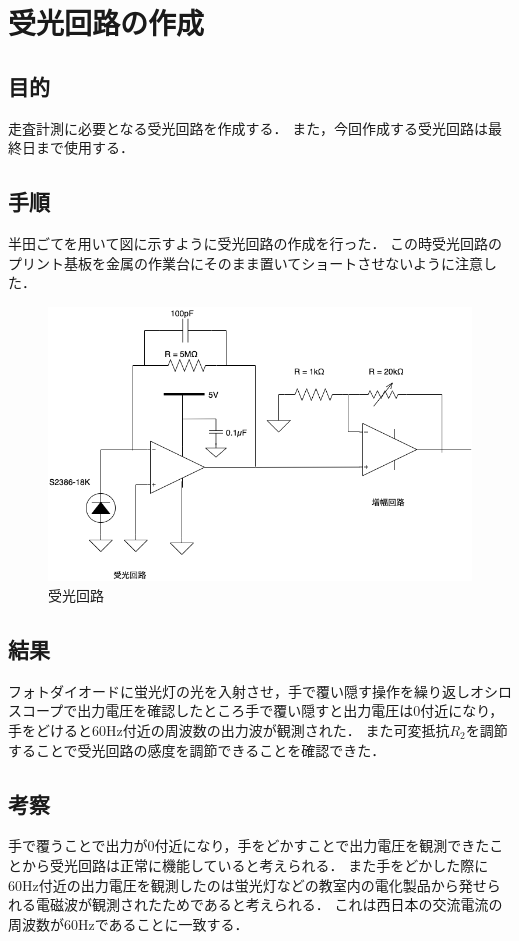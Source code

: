 \documentclass[11pt, a4paper,twocolumn]{jarticle}
\begin{document}
\section{受光回路の作成}
\subsection{目的}
走査計測に必要となる受光回路を作成する．
また，今回作成する受光回路は最終日まで使用する．
\subsection{手順}
半田ごてを用いて図に示すように受光回路の作成を行った．
この時受光回路のプリント基板を金属の作業台にそのまま置いてショートさせないように注意した．

\begin{figure}[ht]
 \begin{center}
  \includegraphics[width=0.8\linewidth]{fig1.png}
 \end{center}
 \caption{受光回路}
 \label{fig:1}
\end{figure}

\subsection{結果}
フォトダイオードに蛍光灯の光を入射させ，手で覆い隠す操作を繰り返しオシロスコープで出力電圧を確認したところ手で覆い隠すと出力電圧は0付近になり，手をどけると60Hz付近の周波数の出力波が観測された．
また可変抵抗${R_2}$を調節することで受光回路の感度を調節できることを確認できた．

\subsection{考察}
手で覆うことで出力が0付近になり，手をどかすことで出力電圧を観測できたことから受光回路は正常に機能していると考えられる．
また手をどかした際に60Hz付近の出力電圧を観測したのは蛍光灯などの教室内の電化製品から発せられる電磁波が観測されたためであると考えられる．
これは西日本の交流電流の周波数が60Hzであることに一致する．
\newpage
\end{document}

